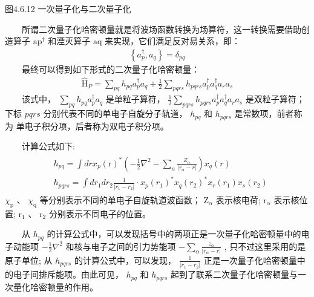 \documentclass[a4paper,11pt,english]{sphinxmanual}
\begin{document}
\begin{center}图4.6.12 一次量子化与二次量子化
\end{center}
\sphinxAtStartPar
  所谓二次量子化哈密顿量就是将波场函数转换为场算符，这一转换需要借助创造算子 \(\mathrm{a}{\mathrm{p}}^{\dagger}\) 和湮灭算子  \(\mathrm{a}{\mathrm{q}}\) 来实现，它们满足反对易关系，即：
\begin{equation*}
\begin{split}\left\{a_{p}^{\dagger}, a_{q}\right\}=\delta_{p q}\end{split}
\end{equation*}
\sphinxAtStartPar
  最终可以得到如下形式的二次量子化哈密顿量：
\begin{equation*}
\begin{split}\hat{\mathrm{H}}_{P}=\sum_{p q} h_{p q} a_{p}^{\dagger} a_{q}+\frac{1}{2} \sum_{p q r s} h_{p q r s} a_{p}^{\dagger} a_{q}^{\dagger} a_{r} a_{s}\end{split}
\end{equation*}
\sphinxAtStartPar
  该式中，  \(\sum_{p q} h_{p q} a_{p}^{\dagger} a_{q}\) 是单粒子算符，  \(\frac{1}{2} \sum_{p q r s} h_{p q r s} a_{p}^{\dagger} a_{q}^{\dagger} a_{r} a_{s}\) 是双粒子算符；下标 \(pqrs\) 分别代表不同的单电子自旋分子轨道，  \(h_{p q}\) 和  \(h_{p q r s}\) 是常数项，前者称为 单电子积分项，后者称为双电子积分项。

\sphinxAtStartPar
  计算公式如下:
\begin{equation*}
\begin{split}\begin{aligned} &h_{p q}=\int d r x_{p}(\mathrm{r})^{*}\left(-\frac{1}{2} \nabla^{2}-\sum_{a} \frac{Z_{\alpha}}{\left|r_{\alpha}-r\right|}\right) x_{q}(r) \\ &h_{p q r s}=\int d r_{1} d r_{2} \frac{1}{\left|r_{1}-r_{2}\right|} \cdot x_{p}\left(r_{1}\right)^{*} x_{q}\left(r_{2}\right)^{*} x_{r}\left(r_{1}\right) x_{s}\left(r_{2}\right) \end{aligned}\end{split}
\end{equation*}
\sphinxAtStartPar
\(\chi_{\mathrm{p}}\) 、 \(\chi_{\mathrm{q}}\) 等分别表示不同的单电子自旋轨道波函数；  \(\mathrm{Z}_{\alpha}\) 表示核电荷;  \(\mathrm{r}_{\alpha}\) 表示核位置;  \(\mathrm{r}_{1}\) 、 \(\mathrm{r}_{2}\) 分别表示不同电子的位置。

\sphinxAtStartPar
  从  \(h_{pq}\) 的计算公式中，可以发现括号中的两项正是一次量子化哈密顿量中的电子动能项  \(-\frac{1}{2} \nabla^{2}\) 和核与电子之间的引力势能项  \(-\sum_{\alpha} \frac{z_{\alpha}}{\left|r_{\alpha}-r\right|}\) , 只不过这里采用的是原子单位; 从 \(h_{p q r s}\) 的计算公式中，可以发现，  \(\frac{1}{\left|r_{1}-r_{2}\right|}\) 正是一次量子化哈密顿量中的电子间排斥能项。由此可见，  \(h_{p q}\) 和   \(h_{pqrs}\) 起到了联系二次量子化哈密顿量与一次量化哈密顿量的作用。
\end{document}
